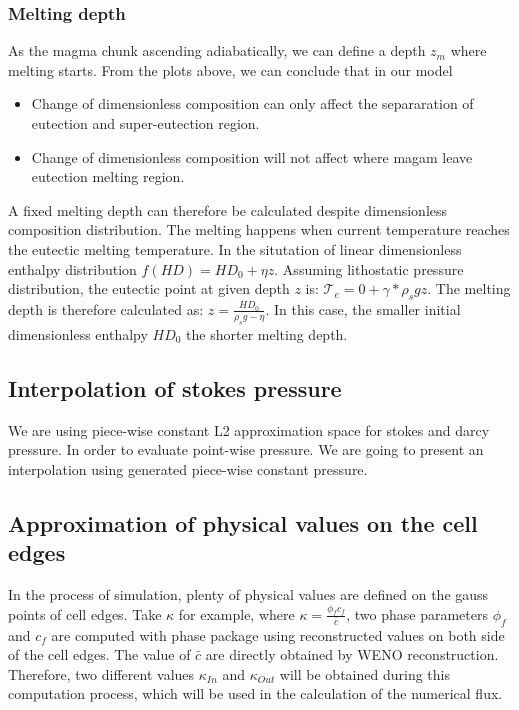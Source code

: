 \subsubsection{Melting depth}
As the magma chunk ascending adiabatically, we can define a depth $z_m$ where melting
starts. From the plots above, we can conclude that in our model
\begin{itemize}
\item Change of dimensionless composition can only affect the separaration of eutection and super-eutection region.
\item Change of dimensionless composition will not affect where magam leave eutection melting region.
\end{itemize}
A fixed melting depth can therefore be calculated despite dimensionless composition distribution.
The melting happens when current temperature reaches the eutectic melting temperature.
In the situtation of linear dimensionless enthalpy distribution $f(HD) = HD_0 + \eta z$.
Assuming lithostatic pressure distribution, the eutectic point at given depth $z$ is: $\mathcal{T}_e = 0 + \gamma *\rho_s g z$.
The melting depth is therefore calculated as: $z = \frac{HD_0}{\rho_s g - \eta}$.
In this case, the smaller initial dimensionless enthalpy $HD_0$ the shorter melting depth.

\subsection{Interpolation of stokes pressure}
We are using piece-wise constant L2 approximation space for stokes and darcy pressure.
In order to evaluate point-wise pressure. We are going to present an interpolation using
generated piece-wise constant pressure.

\subsection{Approximation of physical values on the cell edges}
In the process of simulation, plenty of physical values are defined on the gauss points of cell edges.
Take $\kappa$ for example, where $\kappa = \frac{\phi_f c_f}{\bar{c}}$, two phase parameters $\phi_f$ 
and $c_f$ are computed with phase package using reconstructed values on both side of the cell edges.
The value of $\bar{c}$ are directly obtained by WENO reconstruction. Therefore, two different values
$\kappa_{In}$ and $\kappa_{Out}$ will be obtained during this computation process, which will be 
used in the calculation of the numerical flux.

